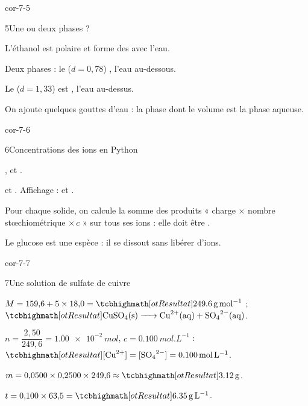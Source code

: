 \begin{blocLivre}{cor-7-5}
\begin{corrige}{5}{Une ou deux phases ?}
\begin{questions}
\item L'éthanol est polaire et forme des  avec l'eau.
\item Deux phases : le  ($d=0{,}78$) , l'eau au-dessous.
\item Le  ($d=1{,}33$) est , l'eau au-dessus.
\item On ajoute quelques gouttes d'eau : la phase dont le volume  est la phase aqueuse.
\end{questions}
\end{corrige}
\end{blocLivre}
\begin{blocLivre}{cor-7-6}
\begin{corrige}{6}{Concentrations des ions en Python}
\begin{questions}
\item {},  et .
\item {} et . Affichage :
 et .
\item Pour chaque solide, on calcule la somme des produits « charge $\times$ nombre stœchiométrique $\times\,c$ » sur tous ses ions : elle
doit être .
\item Le glucose est une espèce  : il se dissout sans libérer d'ions.
\end{questions}
\end{corrige}
\end{blocLivre}
\begin{blocLivre}{cor-7-7}
\begin{corrige}{7}{Une solution de sulfate de cuivre}
\begin{questions}
\item $M=159{,}6+5\times18{,}0=\res{\qty{249,6}{g.mol^{-1}}}$ ; $\res{\ce{CuSO4(s) -> Cu^{2+}(aq) + SO4^{2-}(aq)}}$.
\item $n=\dfrac{2{,}50}{249{,}6}=\qty{1,00e-2}{mol}$, $c=\qty{0,100}{mol.L^{-1}}$ : $\res{[\ce{Cu^{2+}}]=[\ce{SO4^{2-}}]=\qty{0,100}{mol.L^{-1}}}$.
\item $m=0{,}0500\times0{,}2500\times249{,}6\approx\res{\qty{3,12}{g}}$.
\item $t=0{,}100\times63{,}5=\res{\qty{6,35}{g.L^{-1}}}$.
\end{questions}
\end{corrige}
\end{blocLivre}

